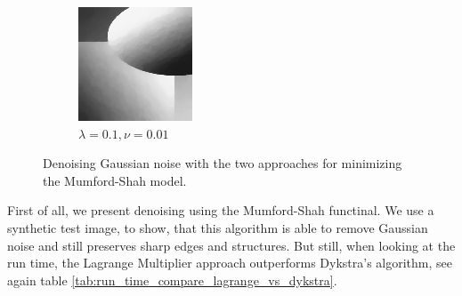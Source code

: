 \documentclass{scrreprt}
\begin{document}
\begin{figure}[!ht]
\begin{subfigure}[b]{0.22\textwidth}
                    \includegraphics[width=\textwidth]{img/lagrange/synth_gauss.png}
                    \caption{$\lambda = 0.1, \nu = 0.01$}
                \end{subfigure}
                \caption[Gaussian with convex relaxed Mumford-Shah.]{Denoising Gaussian noise with the two approaches for minimizing the Mumford-Shah model.}
            \label{fig:synth_gauss_ms_compare}
            \end{figure}

            First of all, we present denoising using the Mumford-Shah functinal. We use a synthetic test image, to show, that this algorithm is able to remove Gaussian noise and still preserves sharp edges and structures. But still, when looking at the run time, the Lagrange Multiplier approach outperforms Dykstra's algorithm, see again table \ref{tab:run_time_compare_lagrange_vs_dykstra}.
\end{document}
